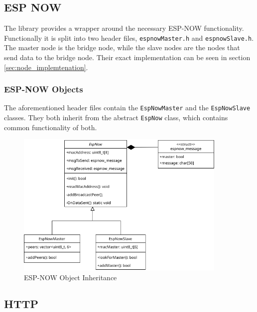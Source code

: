     \subsection{ESP NOW} \label{sec:farilib_espnow}
    The library provides a wrapper around the necessary ESP-NOW functionality.
    Functionally it is split into two header files, \texttt{espnowMaster.h} and 
    \texttt{espnowSlave.h}. The master node is the bridge node, while the slave
    nodes are the nodes that send data to the bridge node. Their exact implementation
    can be seen in section \ref{sec:node_implemtenation}.
        \subsubsection{ESP-NOW Objects}
        The aforementioned header files contain the \texttt{EspNowMaster} and the
        \texttt{EspNowSlave} classes. They both inherit from the abstract 
        \texttt{EspNow} class, which contains common functionality of both.
        \begin{figure}[H]
            \centering
            \includegraphics[width=0.9\textwidth]{topics/flowcharts/ESP-NOW-Inheritence.drawio.png}
            \caption{ESP-NOW Object Inheritance}
        \end{figure}

    \subsection{HTTP} \label{sec:farilib_http}